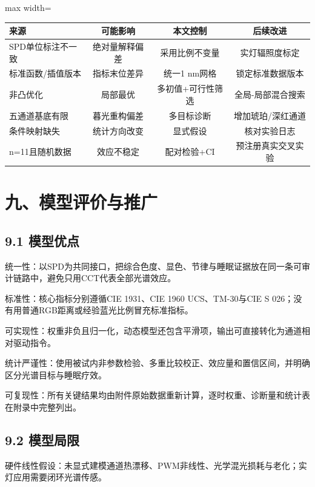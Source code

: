 \documentclass[UTF8,a4paper,12pt]{ctexart}
\begin{document}
\begin{table}[H]
\centering
\small
\begin{adjustbox}{max width=\textwidth}
\begin{tabular}{lccc}
\toprule
来源 & 可能影响 & 本文控制 & 后续改进 \\
\midrule
SPD单位标注不一致 & 绝对量解释偏差 & 采用比例不变量 & 实灯辐照度标定 \\
标准函数/插值版本 & 指标末位差异 & 统一1 nm网格 & 锁定标准数据版本 \\
非凸优化 & 局部最优 & 多初值+可行性筛选 & 全局-局部混合搜索 \\
五通道基底有限 & 暮光重构偏差 & 多目标诊断 & 增加琥珀/深红通道 \\
条件映射缺失 & 统计方向改变 & 显式假设 & 核对实验日志 \\
n=11且随机数据 & 效应不稳定 & 配对检验+CI & 预注册真实交叉实验 \\
\bottomrule
\end{tabular}
\end{adjustbox}
\end{table}

\section{九、模型评价与推广}

\subsection{9.1 模型优点}

统一性：以SPD为共同接口，把综合色度、显色、节律与睡眠证据放在同一条可审计链路中，避免只用CCT代表全部光谱效应。

标准性：核心指标分别遵循CIE 1931、CIE 1960 UCS、TM-30与CIE S 026；没有用普通RGB距离或经验蓝光比例冒充标准指标。

可实现性：权重非负且归一化，动态模型还包含平滑项，输出可直接转化为通道相对驱动指令。

统计严谨性：使用被试内非参数检验、多重比较校正、效应量和置信区间，并明确区分光谱目标与睡眠疗效。

可复现性：所有关键结果均由附件原始数据重新计算，逐时权重、诊断量和统计表在附录中完整列出。

\subsection{9.2 模型局限}

硬件线性假设：未显式建模通道热漂移、PWM非线性、光学混光损耗与老化；实灯应用需要闭环光谱传感。
\end{document}

